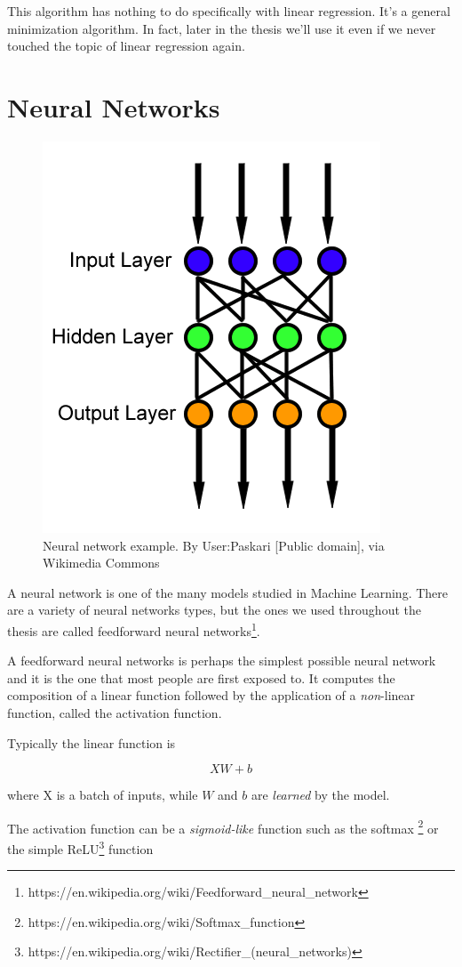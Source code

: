 This algorithm has nothing to do specifically with linear regression. It's a general
minimization algorithm. In fact, later in the thesis we'll use it even
if we never touched the topic of linear regression again.

\section{Neural Networks}

\begin{figure}
  \centering
  \includegraphics[width=0.5\linewidth]{wikipedia-neural-network.png}
  \caption{Neural network example. By User:Paskari [Public domain], via
    Wikimedia Commons}
  \label{fig:wikipedia-neural-network}
\end{figure}

A neural network is one of the many models studied in Machine Learning.
There are a variety of neural networks types, but the ones we used
throughout the thesis are called feedforward neural
networks\footnote{https://en.wikipedia.org/wiki/Feedforward\_neural\_network}.

A feedforward neural networks is perhaps the simplest possible neural
network and it is the one that most people are first exposed to. It
computes the composition of a linear function followed by the
application of a \emph{non}-linear function, called the activation
function.

Typically the linear function is

\[ XW + b \]

where X is a batch of inputs, while $W$ and $b$ are \emph{learned} by the
model.

The activation function can be a \emph{sigmoid-like} function such as
the softmax
\footnote{https://en.wikipedia.org/wiki/Softmax\_function} or the
simple
ReLU\footnote{https://en.wikipedia.org/wiki/Rectifier\_(neural\_networks)}
function

